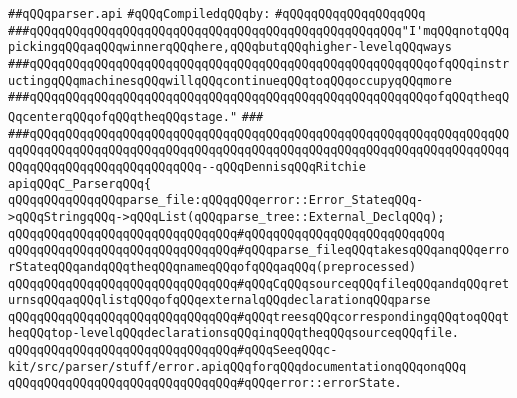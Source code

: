 \label{src/lib/c-kit/src/parser/c-parser.api}
\verb|##qQQqparser.api|\newline
\newline
\verb|#qQQqCompiledqQQqby:|\newline
\verb|#qQQqqQQqqQQqqQQqqQQq|\newline
\newline
\verb|###qQQqqQQqqQQqqQQqqQQqqQQqqQQqqQQqqQQqqQQqqQQqqQQqqQQq"I'mqQQqnotqQQqpickingqQQqaqQQqwinnerqQQqhere,qQQqbutqQQqhigher-levelqQQqways|\newline
\verb|###qQQqqQQqqQQqqQQqqQQqqQQqqQQqqQQqqQQqqQQqqQQqqQQqqQQqqQQqofqQQqinstructingqQQqmachinesqQQqwillqQQqcontinueqQQqtoqQQqoccupyqQQqmore|\newline
\verb|###qQQqqQQqqQQqqQQqqQQqqQQqqQQqqQQqqQQqqQQqqQQqqQQqqQQqqQQqofqQQqtheqQQqcenterqQQqofqQQqtheqQQqstage."|\newline
\verb|###|\newline
\verb|###qQQqqQQqqQQqqQQqqQQqqQQqqQQqqQQqqQQqqQQqqQQqqQQqqQQqqQQqqQQqqQQqqQQqqQQqqQQqqQQqqQQqqQQqqQQqqQQqqQQqqQQqqQQqqQQqqQQqqQQqqQQqqQQqqQQqqQQqqQQqqQQqqQQqqQQqqQQqqQQqqQQq--qQQqDennisqQQqRitchie|\newline
\newline
\newline
\newline
\verb|apiqQQqC_ParserqQQq{|\newline
\newline
\verb|qQQqqQQqqQQqqQQqparse_file:qQQqqQQqerror::Error_StateqQQq->qQQqStringqQQq->qQQqList(qQQqparse_tree::External_DeclqQQq);|\newline
\verb|qQQqqQQqqQQqqQQqqQQqqQQqqQQqqQQq#qQQqqQQqqQQqqQQqqQQqqQQqqQQq|\newline
\verb|qQQqqQQqqQQqqQQqqQQqqQQqqQQqqQQq#qQQqparse_fileqQQqtakesqQQqanqQQqerrorStateqQQqandqQQqtheqQQqnameqQQqofqQQqaqQQq(preprocessed)|\newline
\verb|qQQqqQQqqQQqqQQqqQQqqQQqqQQqqQQq#qQQqCqQQqsourceqQQqfileqQQqandqQQqreturnsqQQqaqQQqlistqQQqofqQQqexternalqQQqdeclarationqQQqparse|\newline
\verb|qQQqqQQqqQQqqQQqqQQqqQQqqQQqqQQq#qQQqtreesqQQqcorrespondingqQQqtoqQQqtheqQQqtop-levelqQQqdeclarationsqQQqinqQQqtheqQQqsourceqQQqfile.|\newline
\verb|qQQqqQQqqQQqqQQqqQQqqQQqqQQqqQQq#qQQqSeeqQQqc-kit/src/parser/stuff/error.apiqQQqforqQQqdocumentationqQQqonqQQq|\newline
\verb|qQQqqQQqqQQqqQQqqQQqqQQqqQQqqQQq#qQQqerror::errorState.|\newline
